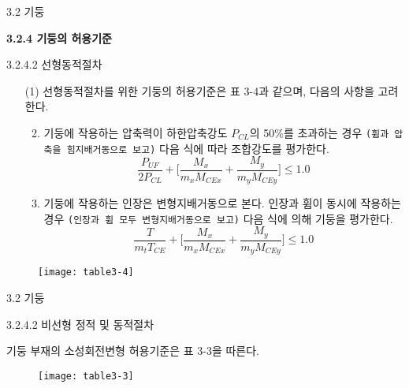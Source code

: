	
		\begin{frame}{3.2 기둥}

	\textbf{3.2.4 기둥의 허용기준} 
		
3.2.4.2 선형동적절차

\begin{enumerate}
	\item[(1)] 선형동적절차를 위한 기둥의 허용기준은 표 3-4과 같으며, 다음의 사항을 고려한다. 
	\begin{enumerate}[label=\large\protect\textcircled{\small\arabic*}]\setcounter{enumii}{1}
		\item 기둥에 작용하는 압축력이 하한압축강도 $P_{CL}$의 50\%를 초과하는 경우 \texttt{(휨과 압축을 힘지배거동으로 보고)} 다음 식에 따라 조합강도를 평가한다.		
		\[\frac{P_{UF}}{2P_{CL}} + \Big[\frac{M_x}{m_x M_{CEx}} + \frac{M_y}{m_y M_{CEy}}\Big] \leq 1.0\]
		\item 기둥에 작용하는 인장은 변형지배거동으로 본다. 인장과 휨이 동시에 작용하는 경우 \texttt{(인장과 휨 모두 변형지배거동으로 보고)} 다음 식에 의해 기둥을 평가한다. 
		\[\frac{T}{m_t T_{CE}} + \Big[\frac{M_x}{m_x M_{CEx}} + \frac{M_y}{m_y M_{CEy}}\Big] \leq 1.0\]
	\end{enumerate}	 
\end{enumerate}

	\end{frame}

\begin{frame}
	\begin{figure}
		\centering
		\texttt{[image: table3-4]}
	\end{figure}
\end{frame}

	\begin{frame}{3.2 기둥}
	
3.2.4.2 비선형 정적 및 동적절차	

기둥 부재의 소성회전변형 허용기준은 표 3-3을 따른다. 

	\begin{figure}
		\centering
		\texttt{[image: table3-3]}
	\end{figure}
\end{frame}

